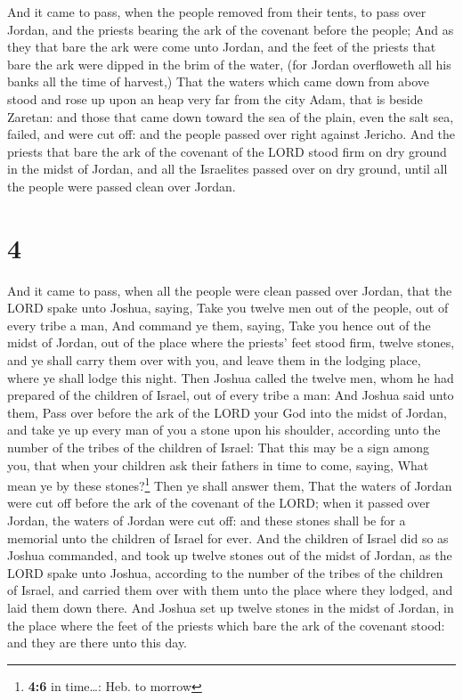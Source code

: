  And it came to pass, when the people removed from their
tents, to pass over Jordan, and the priests bearing the ark of the
covenant before the people;  And as they that bare the
ark were come unto Jordan, and the feet of the priests that bare the ark
were dipped in the brim of the water, (for Jordan overfloweth all his
banks all the time of harvest,)  That the waters which
came down from above stood and rose up upon an heap very far from the
city Adam, that is beside Zaretan: and those that came down toward the
sea of the plain, even the salt sea, failed, and were cut off: and the
people passed over right against Jericho.  And the
priests that bare the ark of the covenant of the LORD stood firm on dry
ground in the midst of Jordan, and all the Israelites passed over on dry
ground, until all the people were passed clean over Jordan.

\hypertarget{section-3}{%
\section{4}\label{section-3}}

 And it came to pass, when all the people were clean
passed over Jordan, that the LORD spake unto Joshua, saying,
 Take you twelve men out of the people, out of every tribe
a man,  And command ye them, saying, Take you hence out of
the midst of Jordan, out of the place where the priests' feet stood
firm, twelve stones, and ye shall carry them over with you, and leave
them in the lodging place, where ye shall lodge this night.
 Then Joshua called the twelve men, whom he had prepared
of the children of Israel, out of every tribe a man:  And
Joshua said unto them, Pass over before the ark of the LORD your God
into the midst of Jordan, and take ye up every man of you a stone upon
his shoulder, according unto the number of the tribes of the children of
Israel:  That this may be a sign among you, that when your
children ask their fathers in time to come, saying, What mean ye by
these stones?\footnote{\textbf{4:6} in time\ldots: Heb. to morrow}
 Then ye shall answer them, That the waters of Jordan were
cut off before the ark of the covenant of the LORD; when it passed over
Jordan, the waters of Jordan were cut off: and these stones shall be for
a memorial unto the children of Israel for ever.  And the
children of Israel did so as Joshua commanded, and took up twelve stones
out of the midst of Jordan, as the LORD spake unto Joshua, according to
the number of the tribes of the children of Israel, and carried them
over with them unto the place where they lodged, and laid them down
there.  And Joshua set up twelve stones in the midst of
Jordan, in the place where the feet of the priests which bare the ark of
the covenant stood: and they are there unto this day.

